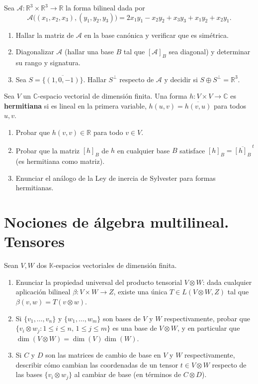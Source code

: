 \documentclass{article}
\newcommand{\R}{\mathbb{R}}
\newcommand{\C}{\mathbb{C}}
\newcommand{\K}{\mathbb{K}}
\DeclareMathOperator{\dimm}{dim}
\newcommand{\gen}[1]{\overline{\{#1\}}}          %
\theoremstyle{plain}
\theoremstyle{definition}
\theoremstyle{remark}
\newenvironment{ejercicio}[1]{\begin{trivlist}
\item[\hskip \labelsep {\bfseries Ejercicio}\hskip \labelsep {\bfseries #1.}]}{\end{trivlist}}
\begin{document}
\begin{ejercicio}{22}
    Sea \(\mathcal A : \R^3 \times \R^3 \to \R\) la forma bilineal dada por
    \[
        \mathcal A\big((x_1,x_2,x_3),(y_1,y_2,y_3)\big) = 2x_1y_1 - x_2y_2 + x_3y_3 + x_1y_2+x_2y_1.
    \]
    \begin{enumerate}
        \item Hallar la matriz de \(\mathcal A\) en la base canónica y verificar que es simétrica.
        \item Diagonalizar \(\mathcal A\) (hallar una base \(B\) tal que \([\mathcal A]_B\) sea diagonal) y determinar su rango y signatura.
        \item Sea \(S = \gen{(1,0,-1)}\). Hallar \(S^\perp\) respecto de \(\mathcal A\) y decidir si \(S \oplus S^\perp = \R^3\).
    \end{enumerate}
\end{ejercicio}

\begin{ejercicio}{23}
    Sea \(V\) un \(\C\)-espacio vectorial de dimensión finita. Una forma \(h : V \times V \to \C\) es \textbf{hermitiana} si es lineal en la primera variable, \(h(u,v) = \overline{h(v,u)}\) para todos \(u,v\).
    \begin{enumerate}
        \item Probar que \(h(v,v) \in \R\) para todo \(v \in V\).
        \item Probar que la matriz \([h]_B\) de \(h\) en cualquier base \(B\) satisface \([h]_B = \overline{[h]_B}^{\,t}\) (es hermitiana como matriz).
        \item Enunciar el análogo de la Ley de inercia de Sylvester para formas hermitianas.
    \end{enumerate}
\end{ejercicio}

\section{Nociones de álgebra multilineal. Tensores}

\begin{ejercicio}{24}
    Sean \(V, W\) dos \(\K\)-espacios vectoriales de dimensión finita.
    \begin{enumerate}
        \item Enunciar la propiedad universal del producto tensorial \(V \otimes W\): dada cualquier aplicación bilineal \(\beta : V \times W \to Z\), existe una única \(T \in L(V\otimes W, Z)\) tal que \(\beta(v,w) = T(v\otimes w)\).
        \item Si \(\{v_1,\ldots,v_n\}\) y \(\{w_1,\ldots,w_m\}\) son bases de \(V\) y \(W\) respectivamente, probar que \(\{v_i \otimes w_j : 1\leq i \leq n,\, 1 \leq j \leq m\}\) es una base de \(V\otimes W\), y en particular que \(\dimm(V\otimes W) = \dimm(V)\dimm(W)\).
        \item Si \(C\) y \(D\) son las matrices de cambio de base en \(V\) y \(W\) respectivamente, describir cómo cambian las coordenadas de un tensor \(t \in V \otimes W\) respecto de las bases \(\{v_i\otimes w_j\}\) al cambiar de base (en términos de \(C \otimes D\)).
    \end{enumerate}
\end{ejercicio}
\end{document}
